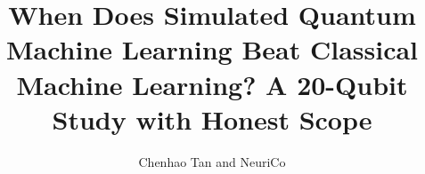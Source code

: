 \documentclass{article}
\title{When Does Simulated Quantum Machine Learning Beat Classical
Machine Learning? A 20-Qubit Study with Honest Scope}
\author{Chenhao Tan and NeuriCo}
\begin{document}
\maketitle

\begin{abstract}

\end{abstract}










\appendix

\end{document}
